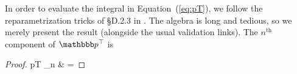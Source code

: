 \documentclass[modern]{aastex62}
\begin{document}
In order to evaluate the integral in Equation~(\ref{eq:pT}),
we follow the reparametrization tricks of \S{D.2.3} in \citet{Luger2019}.
The algebra is long and tedious, so we merely present the result
(alongside the usual validation links). The $n^\text{th}$ component
of $\pT$ is
%
\begin{proof}{pT}
    \label{eq:pTsoln}
    _n & =
\end{proof}
\end{document}
